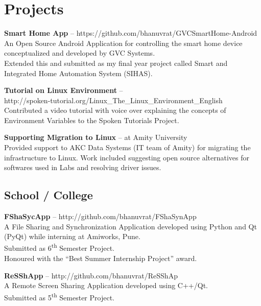 \section {Projects}

\cvlistitem
{\textbf{Smart Home App} -- {\small https://github.com/bhanuvrat/GVCSmartHome-Android}\\
  An Open Source Android Application for controlling the smart home device conceptualized and developed by GVC Systems.\\
  Extended this and submitted as my final year project called Smart and Integrated Home Automation System (SIHAS).
}

\cvlistitem
{\textbf{Tutorial on Linux Environment} -- {\\\small http://spoken-tutorial.org/Linux\_The\_Linux\_Environment\_English}\\Contributed a video tutorial with voice over explaining the concepts of Environment Variables to the Spoken Tutorials Project.\\  
}

\cvlistitem
{\textbf{Supporting Migration to Linux} -- {\small at Amity University}\\
  Provided support to AKC Data Systems (IT team of Amity) for migrating the infrastructure to Linux.
  Work included suggesting open source alternatives for softwares used in Labs and resolving driver issues.\\
}

\subsection{School / College}
\cvlistitem
{\textbf{FShaSycApp} -- {\small http://github.com/bhanuvrat/FShaSynApp}\\
  A File Sharing and Synchronization Application developed using Python and Qt (PyQt) while interning at Amiworks, Pune.\\
  Submitted as 6\textsuperscript{th} Semester Project.\\
  Honoured with the ``Best Summer Internship Project'' award.\\
}

\cvlistitem
{\textbf{ReSShApp} -- {\small http://github.com/bhanuvrat/ReSShAp}\\
  A Remote Screen Sharing Application developed using C++/Qt.\\
  Submitted as 5\textsuperscript{th} Semester Project. \\
}

